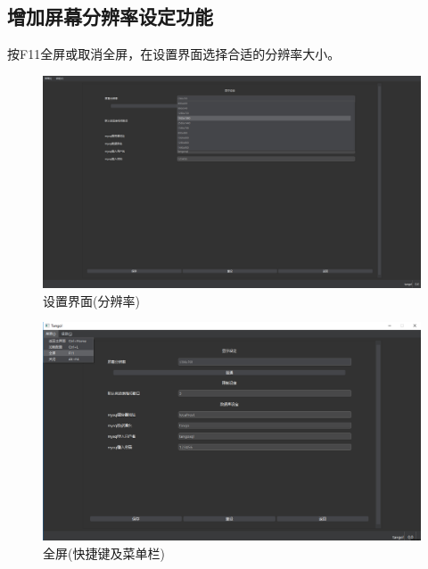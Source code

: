 \documentclass[UTF8]{ctexart}
\newcommand{\fira}[1]{{\firacode {}#1}}
\newcommand{\hfindent}{\hspace*{1em}}
\begin{document}
\subsection{增加屏幕分辨率设定功能}
按F11全屏或取消全屏，在设置界面选择合适的分辨率大小。
\begin{figure}[!h]
    \centering
    \includegraphics[scale=0.23]{./images/fcsetting.png}
    \caption{设置界面(分辨率)}
\end{figure}
\begin{figure}[!h]
    \centering
    \includegraphics[scale=0.3]{./images/fcitem.png}
    \caption{全屏(快捷键及菜单栏)}
\end{figure}

\end{document}
